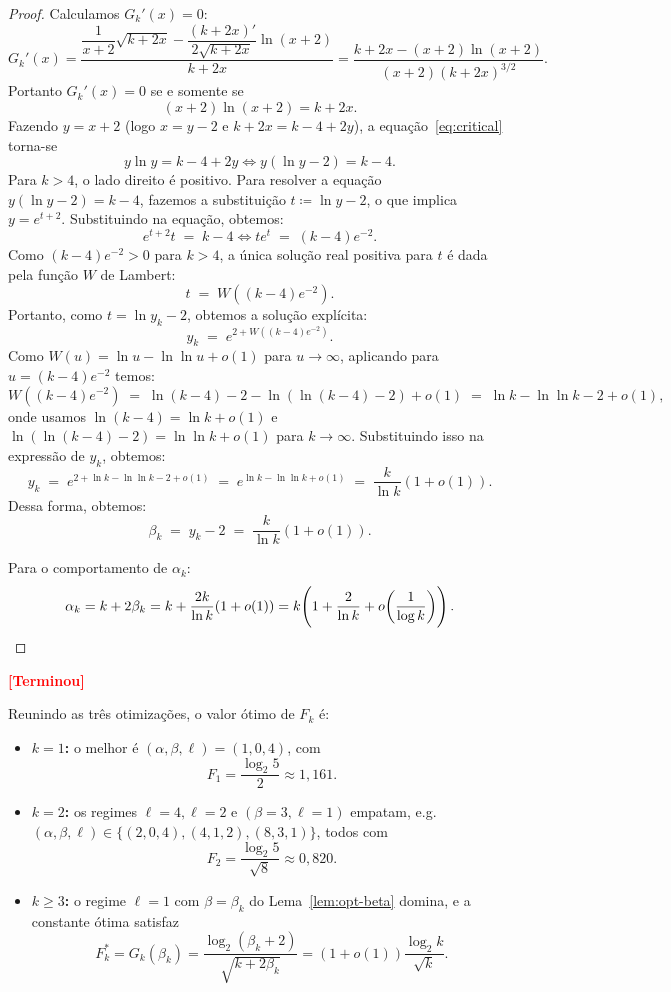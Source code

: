 \documentclass[reqno,a4paper,12pt]{amsart}
\newcommand{\afonso}[1]{\textcolor{red}{\textbf{[#1]}}}
\begin{document}
\begin{proof}
  Calculamos $G_k'(x) = 0$:
  \[
    G_k'(x)
    = \frac{\dfrac{1}{x+2}\sqrt{k+2x}
      - \dfrac{(k+2x)'}{2\sqrt{k+2x}}\ln(x+2)}
    {k+2x}
    = \frac{k+2x - (x+2)\ln(x+2)}{(x+2)(k+2x)^{3/2}}.
  \]
  Portanto $G_k'(x) = 0$ se e somente se
  \begin{equation}\label{eq:critical}
    (x+2)\ln(x+2) = k + 2x.
  \end{equation}
  Fazendo $y = x+2$ (logo $x = y-2$ e $k+2x = k-4+2y$), a equação~\eqref{eq:critical} torna-se
  \[
    y\ln y = k - 4 + 2y
    \iff
    y(\ln y - 2) = k - 4.
  \]
  Para $k > 4$, o lado direito é positivo. Para resolver a equação $y(\ln y - 2) = k - 4$, fazemos a substituição $t \coloneqq \ln y - 2$, o que implica $y = e^{t+2}$. Substituindo na equação, obtemos:
  \[
    e^{t+2} t \;=\; k-4
    \iff
    t e^t \;=\; (k-4)e^{-2}.
  \]
  Como $(k-4)e^{-2} > 0$ para $k > 4$, a única solução real positiva para $t$ é dada pela função $W$ de Lambert:
  \[
    t \;=\; W\!\left((k-4)e^{-2}\right).
  \]
  Portanto, como $t = \ln y_k - 2$, obtemos a solução explícita:
  \[
    y_k \;=\; e^{2 + W\left((k-4)e^{-2}\right)}.
  \]
  Como $W(u) = \ln u - \ln\ln u + o(1)$ para $u \to \infty$, aplicando para $u = (k-4)e^{-2}$ temos:
  \[
    W\!\left((k-4)e^{-2}\right)
    \;=\; \ln(k-4) - 2 - \ln(\ln(k-4)-2) + o(1)
    \;=\; \ln k - \ln\ln k - 2 + o(1),
  \]
  onde usamos $\ln(k-4) = \ln k + o(1)$ e $\ln(\ln(k-4)-2) = \ln\ln k + o(1)$ para $k \to \infty$. Substituindo isso na expressão de $y_k$, obtemos:
  \[
    y_k \;=\; e^{2 + \ln k - \ln\ln k - 2 + o(1)}
    \;=\; e^{\ln k - \ln\ln k + o(1)}
    \;=\; \frac{k}{\ln k}(1+o(1)).
  \]
  Dessa forma, obtemos:
  \[
    \beta_k \;=\; y_k - 2 \;=\; \frac{k}{\ln k}(1+o(1)).
  \]

  Para o comportamento de $\alpha_k$:
  \[
    \alpha_k = k + 2\beta_k
    = k + \frac{2k}{\ln k}(1+o(1))
    = k\!\left(1 + \frac{2}{\ln k} + o\!\left(\frac{1}{\log k}\right)\right). \qedhere
  \]
\end{proof}

\afonso{Terminou}

Reunindo as três otimizações, o valor ótimo de $F_k$ é:

\begin{itemize}
  \item \textbf{$k=1$:} o melhor é $(\alpha,\beta,\ell)=(1,0,4)$, com
        \[
          F_1 = \frac{\log_2 5}{2} \approx 1{,}161.
        \]

  \item \textbf{$k=2$:} os regimes $\ell=4,\ell=2$ e $(\beta=3,\ell=1)$ empatam, e.g.\
        $(\alpha,\beta,\ell) \in \{(2,0,4),(4,1,2),(8,3,1)\}$, todos com
        \[
          F_2 = \frac{\log_2 5}{\sqrt{8}} \approx 0{,}820.
        \]

  \item \textbf{$k \geq 3$:} o regime $\ell=1$ com $\beta = \beta_k$
        do Lema~\ref{lem:opt-beta} domina, e a constante ótima satisfaz
        \[
          F_k^* = G_k(\beta_k)
          = \frac{\log_2(\beta_k+2)}{\sqrt{k+2\beta_k}}
          = (1+o(1))\frac{\log_2 k}{\sqrt{k}}.
        \]
\end{itemize}
\end{document}
